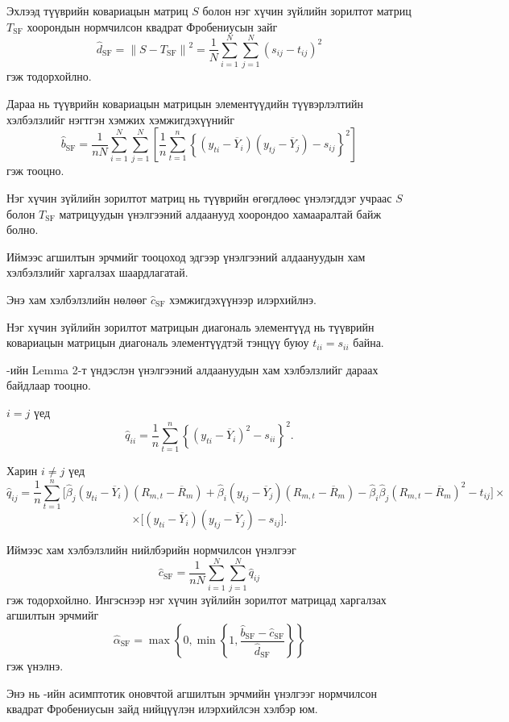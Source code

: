 Эхлээд түүврийн ковариацын матриц $S$ болон
нэг хүчин зүйлийн зорилтот матриц
$T_{\mathrm{SF}}$ хоорондын нормчилсон
квадрат Фробениусын зайг
\[
\widehat d_{\mathrm{SF}}
=
\left\|S-T_{\mathrm{SF}}\right\|^2=
\frac{1}{N}
\sum_{i=1}^{N}
\sum_{j=1}^{N}
(s_{ij}-t_{ij})^2
\]
гэж тодорхойлно.

Дараа нь түүврийн ковариацын матрицын
элементүүдийн түүвэрлэлтийн хэлбэлзлийг
нэгтгэн хэмжих хэмжигдэхүүнийг
\[
\widehat b_{\mathrm{SF}}
=
\frac{1}{nN}
\sum_{i=1}^{N}
\sum_{j=1}^{N}
\left[
\frac{1}{n}
\sum_{t=1}^{n}
\left\{
(y_{ti}-\overline{Y}_i)
(y_{tj}-\overline{Y}_j)
-s_{ij}
\right\}^{2}
\right]
\]
гэж тооцно.

Нэг хүчин зүйлийн зорилтот матриц нь
түүврийн өгөгдлөөс үнэлэгддэг учраас
$S$ болон $T_{\mathrm{SF}}$ матрицуудын
үнэлгээний алдаанууд хоорондоо
хамааралтай байж болно.

Иймээс агшилтын эрчмийг тооцоход
эдгээр үнэлгээний алдаануудын
хам хэлбэлзлийг харгалзах шаардлагатай.

Энэ хам хэлбэлзлийн нөлөөг
$\widehat c_{\mathrm{SF}}$ хэмжигдэхүүнээр
илэрхийлнэ.

Нэг хүчин зүйлийн зорилтот матрицын диагональ
элементүүд нь түүврийн ковариацын матрицын
диагональ элементүүдтэй тэнцүү буюу
$t_{ii}=s_{ii}$ байна.

\citet{ledoitwolf2003}-ийн Lemma 2-т
үндэслэн үнэлгээний алдаануудын
хам хэлбэлзлийг дараах байдлаар тооцно.

$i=j$ үед
\[
\widehat q_{ii}
=
\frac{1}{n}
\sum_{t=1}^{n}
\left\{
(y_{ti}-\overline{Y}_i)^2-s_{ii}
\right\}^{2}.
\]

Харин $i\neq j$ үед
\[
	\widehat q_{ij}
	=
	\frac{1}{n}
	\sum_{t=1}^{n}
	\Big[
	\widehat{\beta}_j
	(y_{ti}-\overline{Y}_i)
	(R_{m,t}-\overline{R}_m)
	+
	\widehat{\beta}_i
	(y_{tj}-\overline{Y}_j)
	(R_{m,t}-\overline{R}_m)
	-
	\widehat{\beta}_i\widehat{\beta}_j
	(R_{m,t}-\overline{R}_m)^2
	-t_{ij}
	\Big]\times
	\]
	\[\times
	\Big[
	(y_{ti}-\overline{Y}_i)
	(y_{tj}-\overline{Y}_j)-s_{ij}
	\Big].
\]

Иймээс хам хэлбэлзлийн нийлбэрийн
нормчилсон үнэлгээг
\[
\widehat c_{\mathrm{SF}}
=
\frac{1}{nN}
\sum_{i=1}^{N}
\sum_{j=1}^{N}
\widehat q_{ij}
\]
гэж тодорхойлно.
Ингэснээр нэг хүчин зүйлийн зорилтот
матрицад харгалзах агшилтын эрчмийг
\[
\widehat{\alpha}_{\mathrm{SF}}
=
\max
\left\{
0,
\min
\left\{
1,
\frac{
	\widehat b_{\mathrm{SF}}
	-
	\widehat c_{\mathrm{SF}}
}{
	\widehat d_{\mathrm{SF}}
}
\right\}
\right\}
\]
гэж үнэлнэ.

Энэ нь \citet{ledoitwolf2003}-ийн
асимптотик оновчтой агшилтын эрчмийн
үнэлгээг нормчилсон квадрат
Фробениусын зайд нийцүүлэн
илэрхийлсэн хэлбэр юм.

